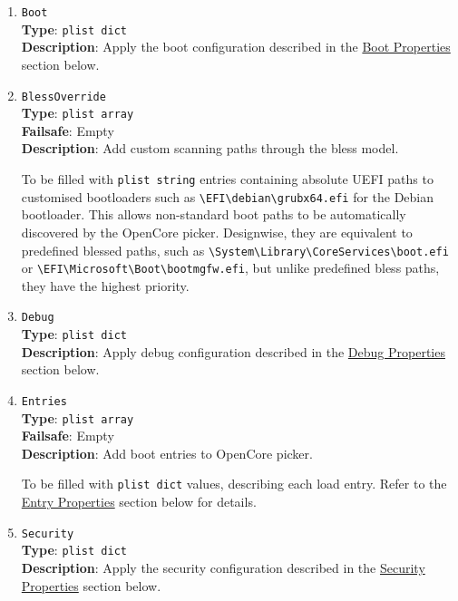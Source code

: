 \documentclass[]{article}
\begin{document}
\begin{enumerate}
\item
  \texttt{Boot}\\
  \textbf{Type}: \texttt{plist\ dict}\\
  \textbf{Description}: Apply the boot configuration described in the
  \hyperref[miscbootprops]{Boot Properties} section below.

\item
  \texttt{BlessOverride}\\
  \textbf{Type}: \texttt{plist\ array}\\
  \textbf{Failsafe}: Empty\\
  \textbf{Description}: Add custom scanning paths through the bless model.

  To be filled with \texttt{plist\ string} entries containing
  absolute UEFI paths to customised bootloaders such as
  \texttt{\textbackslash EFI\textbackslash debian\textbackslash grubx64.efi}
  for the Debian bootloader. This allows non-standard boot paths to be automatically
  discovered by the OpenCore picker. Designwise, they are equivalent to predefined blessed paths, such as
  \texttt{\textbackslash System\textbackslash Library\textbackslash CoreServices\textbackslash boot.efi}
  or \texttt{\textbackslash EFI\textbackslash Microsoft\textbackslash Boot\textbackslash bootmgfw.efi},
  but unlike predefined bless paths, they have the highest priority.

\item
  \texttt{Debug}\\
  \textbf{Type}: \texttt{plist\ dict}\\
  \textbf{Description}: Apply debug configuration described in the
  \hyperref[miscdebugprops]{Debug Properties} section below.

\item
  \texttt{Entries}\\
  \textbf{Type}: \texttt{plist\ array}\\
  \textbf{Failsafe}: Empty\\
  \textbf{Description}: Add boot entries to OpenCore picker.

  To be filled with \texttt{plist\ dict} values, describing each load entry.
  Refer to the \hyperref[miscentryprops]{Entry Properties} section below for details.

\item
  \texttt{Security}\\
  \textbf{Type}: \texttt{plist\ dict}\\
  \textbf{Description}: Apply the security configuration described in the
  \hyperref[miscsecurityprops]{Security Properties} section below.


\end{enumerate}
\end{document}
